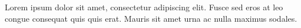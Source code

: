 \documentclass{article}
\begin{document}
Lorem ipsum dolor sit amet, consectetur adipiscing elit. Fusce sed eros at leo congue consequat quis quis erat. Mauris
sit amet urna ac nulla maximus sodales.
\end{document}
